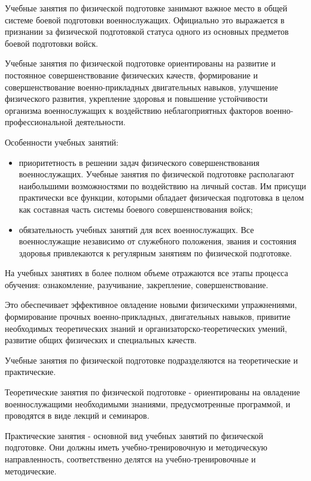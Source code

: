 \documentclass[a4paper]{article}
\begin{document}
    Учебные занятия по физической подготовке занимают важное место в общей системе боевой подготовки военнослужащих. Официально это выражается в признании за физической подготовкой статуса одного из основных предметов боевой подготовки войск.

    Учебные занятия по физической подготовке ориентированы на развитие и постоянное совершенствование физических качеств, формирование и совершенствование военно-прикладных двигательных навыков, улучшение физического развития, укрепление здоровья и повышение устойчивости организма военнослужащих к воздействию неблагоприятных факторов военно-профессиональной деятельности.

    Особенности учебных занятий:

    \begin{itemize}
        \item приоритетность в решении задач физического совершенствования военнослужащих. Учебные занятия по физической подготовке располагают наибольшими возможностями по воздействию на личный состав. Им присущи практически все функции, которыми обладает физическая подготовка в целом как составная часть системы боевого совершенствования войск;
        \item обязательность учебных занятий для всех военнослужащих. Все военнослужащие независимо от служебного положения, звания и состояния здоровья привлекаются к регулярным занятиям по физической подготовке.
    \end{itemize}

    На учебных занятиях в более полном объеме отражаются все этапы процесса обучения: ознакомление, разучивание, закрепление, совершенствование.

    Это обеспечивает эффективное овладение новыми физическими упражнениями, формирование прочных военно-прикладных, двигательных навыков, привитие необходимых теоретических знаний и организаторско-теоретических умений, развитие общих физических и специальных качеств.

    Учебные занятия по физической подготовке подразделяются на теоретические и практические.

    Теоретические занятия по физической подготовке - ориентированы на овладение военнослужащими необходимыми знаниями, предусмотренные программой, и проводятся в виде лекций и семинаров.

    Практические занятия - основной вид учебных занятий по физической подготовке. Они должны иметь учебно-тренировочную и методическую направленность, соответственно делятся на учебно-тренировочные и методические.
\end{document}
